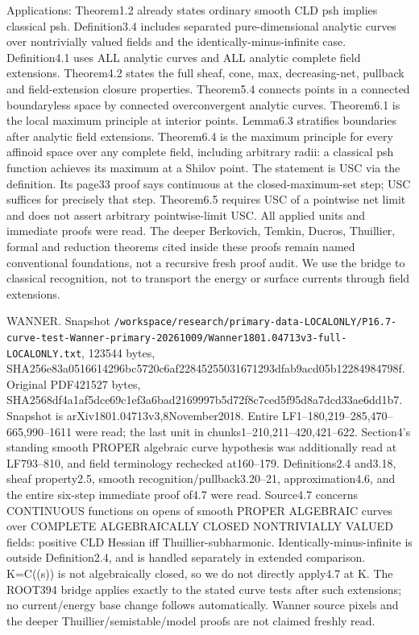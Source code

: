 \documentclass[11pt]{article}
\begin{document}
Applications: Theorem1.2 already states ordinary smooth CLD psh implies classical psh. Definition3.4 includes separated pure-dimensional analytic curves over nontrivially valued fields and the identically-minus-infinite case. Definition4.1 uses ALL analytic curves and ALL analytic complete field extensions. Theorem4.2 states the full sheaf, cone, max, decreasing-net, pullback and field-extension closure properties. Theorem5.4 connects points in a connected boundaryless space by connected overconvergent analytic curves. Theorem6.1 is the local maximum principle at interior points. Lemma6.3 stratifies boundaries after analytic field extensions. Theorem6.4 is the maximum principle for every affinoid space over any complete field, including arbitrary radii: a classical psh function achieves its maximum at a Shilov point. The statement is USC via the definition. Its page33 proof says continuous at the closed-maximum-set step; USC suffices for precisely that step. Theorem6.5 requires USC of a pointwise net limit and does not assert arbitrary pointwise-limit USC. All applied units and immediate proofs were read. The deeper Berkovich, Temkin, Ducros, Thuillier, formal and reduction theorems cited inside these proofs remain named conventional foundations, not a recursive fresh proof audit. We use the bridge to classical recognition, not to transport the energy or surface currents through field extensions.

WANNER. Snapshot \texttt{/\allowbreak workspace/\allowbreak research/\allowbreak primary-data-LOCALONLY/\allowbreak P16.7-curve-test-Wanner-primary-20261009/\allowbreak Wanner1801.04713v3-full-LOCALONLY.txt}, 123544 bytes, SHA256e83a0516614296bc5720c6af22845255031671293dfab9acd05b12284984798f. Original PDF421527 bytes, SHA2568df4a1af5dce69c1ef3a6bad2169997b5d72f8c7ced5f95d8a7dcd33ae6dd1b7. Snapshot is arXiv1801.04713v3,8November2018. Entire LF1--180,219--285,470--665,990--1611 were read; the last unit in chunks1--210,211--420,421--622. Section4's standing smooth PROPER algebraic curve hypothesis was additionally read at LF793--810, and field terminology rechecked at160--179. Definitions2.4 and3.18, sheaf property2.5, smooth recognition/pullback3.20--21, approximation4.6, and the entire six-step immediate proof of4.7 were read. Source4.7 concerns CONTINUOUS functions on opens of smooth PROPER ALGEBRAIC curves over COMPLETE ALGEBRAICALLY CLOSED NONTRIVIALLY VALUED fields: positive CLD Hessian iff Thuillier-subharmonic. Identically-minus-infinite is outside Definition2.4, and is handled separately in extended comparison. K=C((s)) is not algebraically closed, so we do not directly apply4.7 at K. The ROOT394 bridge applies exactly to the stated curve tests after such extensions; no current/energy base change follows automatically. Wanner source pixels and the deeper Thuillier/semistable/model proofs are not claimed freshly read.
\end{document}
